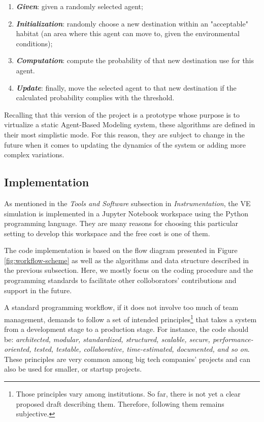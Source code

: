 \begin{enumerate}
    \item \textbf{\textit{Given}}: given a randomly selected agent;
    \item \textbf{\textit{Initialization}}: randomly choose a new destination within an "acceptable" habitat (an area where this agent can move to, given the environmental conditions);
    \item \textbf{\textit{Computation}}: compute the probability of that new destination use for this agent.
    \item \textbf{\textit{Update}}: finally, move the selected agent to that new destination if the calculated probability complies with the threshold.
\end{enumerate}

Recalling that this version of the project is a prototype whose purpose is to virtualize a static Agent-Based Modeling system, these algorithms are defined in their most simplistic mode. For this reason, they are subject to change in the future when it comes to updating the dynamics of the system or adding more complex variations.

\subsection{Implementation}
As mentioned in the \emph{Tools and Software} subsection in \emph{Instrumentation}, the VE simulation is implemented in a Jupyter Notebook workspace using the Python programming language. They are many reasons for choosing this particular setting to develop this workspace and the free cost is one of them.

The code implementation is based on the flow diagram presented in Figure \ref{fig:workflow-scheme} as well as the algorithms and data structure described in the previous subsection. Here, we mostly focus on the coding procedure and the programming standards to facilitate other colloborators' contributions and support in the future.

A standard programming workflow, if it does not involve too much of team management, demands to follow a set of intended principles\footnote{Those principles vary among institutions. So far, there is not yet a clear proposed draft describing them. Therefore, following them remains subjective.} that takes a system from a development stage to a production stage. For instance, the code should be: \textit{architected, modular, standardized, structured, scalable, secure, performance-oriented, tested, testable, collaborative, time-estimated, documented, and so on}\cite{smashingmagazine}. These principles are very common among big tech companies' projects and can also be used for smaller, or startup projects.

